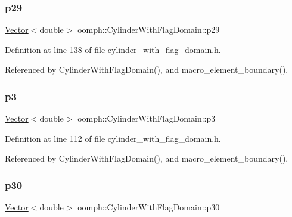 \subsubsection{\texorpdfstring{p29}{p29}}
{\footnotesize\ttfamily \hyperlink{classoomph_1_1Vector}{Vector}$<$double$>$ oomph\+::\+Cylinder\+With\+Flag\+Domain\+::p29\hspace{0.3cm}{\ttfamily [private]}}



Definition at line 138 of file cylinder\+\_\+with\+\_\+flag\+\_\+domain.\+h.



Referenced by Cylinder\+With\+Flag\+Domain(), and macro\+\_\+element\+\_\+boundary().

\mbox{\label{classoomph_1_1CylinderWithFlagDomain_a6327976b3d8e582cfc232be01c45d975}} 
\subsubsection{\texorpdfstring{p3}{p3}}
{\footnotesize\ttfamily \hyperlink{classoomph_1_1Vector}{Vector}$<$double$>$ oomph\+::\+Cylinder\+With\+Flag\+Domain\+::p3\hspace{0.3cm}{\ttfamily [private]}}



Definition at line 112 of file cylinder\+\_\+with\+\_\+flag\+\_\+domain.\+h.



Referenced by Cylinder\+With\+Flag\+Domain(), and macro\+\_\+element\+\_\+boundary().

\mbox{\label{classoomph_1_1CylinderWithFlagDomain_af35a25c3f63e71f2bff61b1da3384630}} 
\subsubsection{\texorpdfstring{p30}{p30}}
{\footnotesize\ttfamily \hyperlink{classoomph_1_1Vector}{Vector}$<$double$>$ oomph\+::\+Cylinder\+With\+Flag\+Domain\+::p30\hspace{0.3cm}{\ttfamily [private]}}



